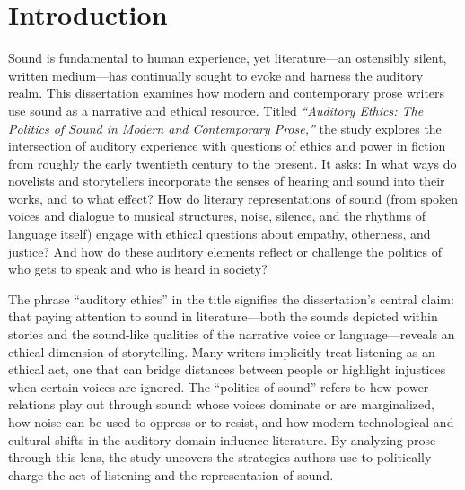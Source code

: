 \documentclass[12pt]{report}
\begin{document}
\chapter{Introduction}
Sound is fundamental to human experience, yet literature—an ostensibly silent, written medium—has continually sought to evoke and harness the auditory realm. This dissertation examines how modern and contemporary prose writers use sound as a narrative and ethical resource. Titled \textit{“Auditory Ethics: The Politics of Sound in Modern and Contemporary Prose,”} the study explores the intersection of auditory experience with questions of ethics and power in fiction from roughly the early twentieth century to the present. It asks: In what ways do novelists and storytellers incorporate the senses of hearing and sound into their works, and to what effect? How do literary representations of sound (from spoken voices and dialogue to musical structures, noise, silence, and the rhythms of language itself) engage with ethical questions about empathy, otherness, and justice? And how do these auditory elements reflect or challenge the politics of who gets to speak and who is heard in society?

The phrase “auditory ethics” in the title signifies the dissertation’s central claim: that paying attention to sound in literature—both the sounds depicted within stories and the sound-like qualities of the narrative voice or language—reveals an ethical dimension of storytelling. Many writers implicitly treat listening as an ethical act, one that can bridge distances between people or highlight injustices when certain voices are ignored. The “politics of sound” refers to how power relations play out through sound: whose voices dominate or are marginalized, how noise can be used to oppress or to resist, and how modern technological and cultural shifts in the auditory domain influence literature. By analyzing prose through this lens, the study uncovers the strategies authors use to politically charge the act of listening and the representation of sound.
\end{document}
